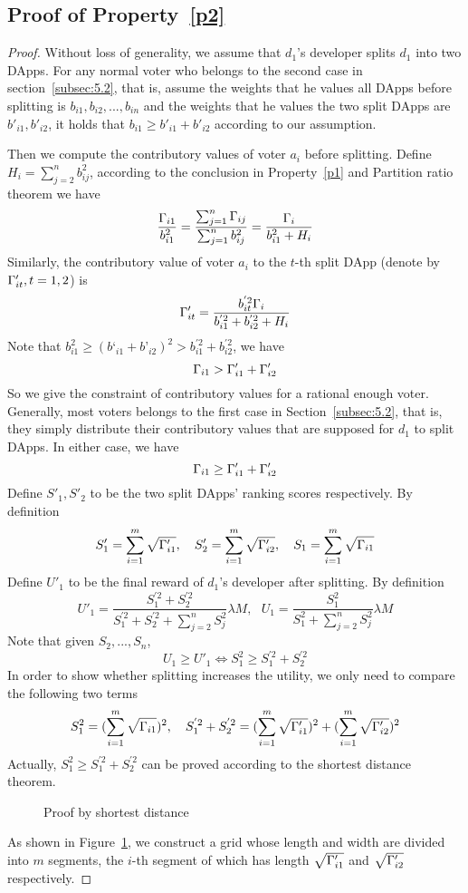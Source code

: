 \subsection{Proof of Property~\ref{p2}}
\label{subsection:proof2}
\begin{proof}
	Without loss of generality, we assume that $d_1$'s developer splits $d_1$ into two DApps. For any normal voter who belongs to the second case in section~\ref{subsec:5.2}, that is, assume the weights that he values all DApps before splitting is $b_{i1},b_{i2},...,b_{in}$ and the weights that he values the two split DApps are $b'_{i1},b'_{i2}$, it holds that $b_{i1} \geq b'_{i1}+b'_{i2}$ according to our assumption.
	
	Then we compute the contributory values of voter $a_i$ before splitting. Define $H_i = \sum_{j=2}^n b_{ij}^2$, according to the conclusion in Property~\ref{p1} and Partition ratio theorem we have 
		 $$\frac{\Gamma_{i1}}{b_{i1}^2} = \frac{\sum_{j=1}^n \Gamma_{ij}}{\sum_{j=1}^n b_{ij}^2} = \frac{\Gamma_i}{b_{i1}^2+H_i}$$
  Similarly, the contributory value of voter $a_i$ to the $t$-th split DApp (denote by $\Gamma'_{it},t=1,2$) is
  	 $$\Gamma'_{it} =  \frac{b_{it}^{'2}\Gamma_i}{b_{i1}^{'2}+b_{i2}^{'2}+H_i}$$
  	 Note that $b_{i1}^2 \geq (b‘_{i1}+b’_{i2})^2 >b_{i1}^{'2}+b_{i2}^{'2}$, we have
  	 $$\Gamma_{i1} > \Gamma'_{i1}+\Gamma'_{i2}$$
  	 So we give the constraint of contributory values for a rational enough voter. Generally, most voters belongs to the first case in Section~\ref{subsec:5.2}, that is, they simply distribute their contributory values that are supposed for $d_1$ to split DApps. In either case, we have 
  	 	 	$$\Gamma_{i1} \geq \Gamma'_{i1}+\Gamma'_{i2}$$
  	 Define $S'_1,S'_2$ to be the two split DApps' ranking scores respectively. By definition 
  	 	 $$S'_1 =  \sum_{i=1}^m \sqrt{\Gamma'_{i1}},~~~S'_2 =  \sum_{i=1}^m \sqrt{\Gamma'_{i2}},~~~S_1 = \sum_{i=1}^m \sqrt{\Gamma_{i1}}$$
  	Define $U'_1$ to be the final reward of $d_1$'s developer after splitting. By definition 
  		 $$U'_1=\frac{S_1^{'2}+S_2^{'2}}{S_1^{'2}+S_2^{'2}+\sum_{j=2}^n S_j^2} \lambda M,~~~U_1=\frac{S^2_1}{S_1^2+\sum_{j=2}^n S_j^2} \lambda M$$
  	Note that given $S_2,...,S_n$, 
  		 $$ U_1 \geq U'_1 \Leftrightarrow S_1^2 \geq S_1^{'2}+S_2^{'2}$$
   In order to show whether splitting increases the utility, we only need to compare the following two terms
   	 $$S_1^2 = (\sum_{i=1}^m \sqrt{\Gamma_{i1}})^2,~~~S_1^{'2}+S_2^{'2}=  (\sum_{i=1}^m \sqrt{\Gamma'_{i1}})^2+(\sum_{i=1}^m \sqrt{\Gamma'_{i2}})^2$$
   	Actually, $S_1^2 \geq S_1^{'2}+S_2^{'2}$ can be proved according to the shortest distance theorem. 
   		 \begin{figure}
   		 	\centering
   		 	
   		 	\caption{Proof by shortest distance\label{fig:path}}
   		 \end{figure}
   As shown in Figure~\ref{fig:path}, we construct a grid whose length and width are divided into $m$ segments,  the $i$-th segment of which has length $\sqrt{\Gamma'_{i1}}$ and $\sqrt{\Gamma'_{i2}}$ respectively. 
   

\end{proof}

